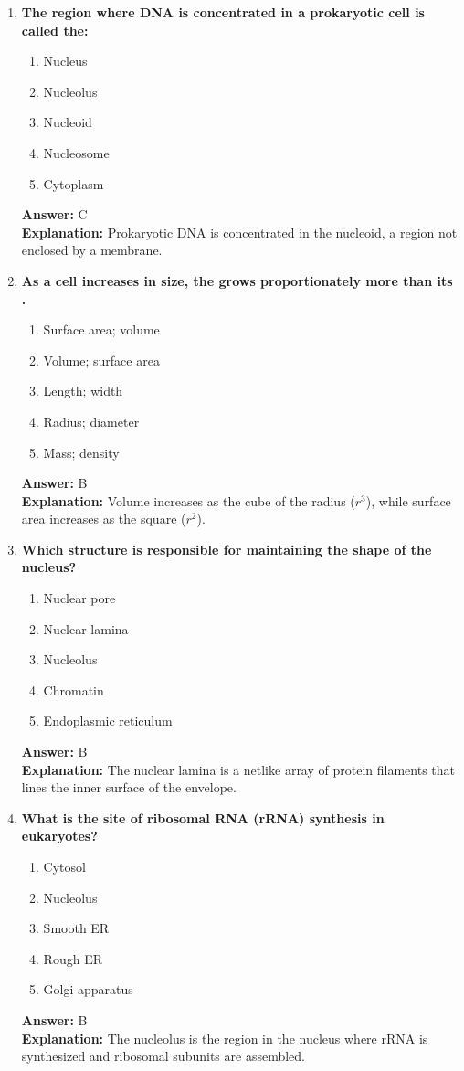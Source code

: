 \documentclass[11pt, a4paper]{article}
\begin{document}
\begin{enumerate}[leftmargin=*, label=\arabic*.]
\item \textbf{The region where DNA is concentrated in a prokaryotic cell is called the:}
\begin{enumerate}[label=\Alph*.]
\item Nucleus
\item Nucleolus
\item Nucleoid
\item Nucleosome
\item Cytoplasm
\end{enumerate}
\textbf{Answer:} C \\
\textbf{Explanation:} Prokaryotic DNA is concentrated in the nucleoid, a region not enclosed by a membrane.

\item \textbf{As a cell increases in size, the \underline{\hspace{1cm}} grows proportionately more than its \underline{\hspace{1cm}}.}
\begin{enumerate}[label=\Alph*.]
\item Surface area; volume
\item Volume; surface area
\item Length; width
\item Radius; diameter
\item Mass; density
\end{enumerate}
\textbf{Answer:} B \\
\textbf{Explanation:} Volume increases as the cube of the radius ($r^3$), while surface area increases as the square ($r^2$).

\item \textbf{Which structure is responsible for maintaining the shape of the nucleus?}
\begin{enumerate}[label=\Alph*.]
\item Nuclear pore
\item Nuclear lamina
\item Nucleolus
\item Chromatin
\item Endoplasmic reticulum
\end{enumerate}
\textbf{Answer:} B \\
\textbf{Explanation:} The nuclear lamina is a netlike array of protein filaments that lines the inner surface of the envelope.

\item \textbf{What is the site of ribosomal RNA (rRNA) synthesis in eukaryotes?}
\begin{enumerate}[label=\Alph*.]
\item Cytosol
\item Nucleolus
\item Smooth ER
\item Rough ER
\item Golgi apparatus
\end{enumerate}
\textbf{Answer:} B \\
\textbf{Explanation:} The nucleolus is the region in the nucleus where rRNA is synthesized and ribosomal subunits are assembled.


\end{enumerate}
\end{document}
